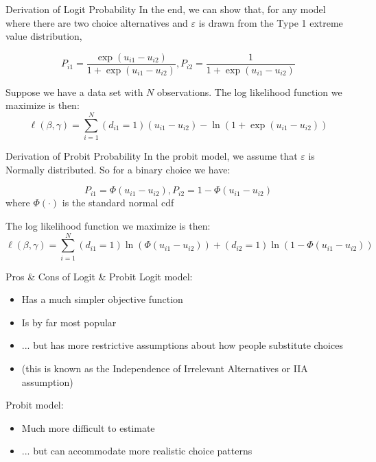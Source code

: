 \documentclass[english,aspectratio=169,12pt,xcolor=dvipsnames]{beamer}
\begin{document}
\begin{frame}{Derivation of Logit Probability}
In the end, we can show that, for any model where there are two choice alternatives and $\varepsilon$ is drawn from the Type 1 extreme value distribution,

\begin{displaymath}
P_{i1}=\frac{\exp(u_{i1}-u_{i2})}{1+\exp(u_{i1}-u_{i2})},P_{i2}=\frac{1}{1+\exp(u_{i1}-u_{i2})}
\end{displaymath}

Suppose we have a data set with $N$ observations. The log likelihood function we maximize is then:
\begin{displaymath}
\ell(\beta,\gamma)=\sum_{i=1}^N(d_{i1}=1)(u_{i1}-u_{i2})-\ln\left(1+\exp(u_{i1}-u_{i2})\right)
\end{displaymath}

\end{frame}



\begin{frame}{Derivation of Probit Probability}
In the probit model, we assume that $\varepsilon$ is Normally distributed. So for a binary choice we have:

\begin{displaymath}
P_{i1}=\Phi\left(u_{i1}-u_{i2}\right),P_{i2}=1-\Phi\left(u_{i1}-u_{i2}\right)
\end{displaymath}
where $\Phi\left(\cdot\right)$ is the standard normal cdf

The log likelihood function we maximize is then:
\begin{displaymath}
\ell(\beta,\gamma)=\sum_{i=1}^N(d_{i1}=1)\ln\left(\Phi\left(u_{i1}-u_{i2}\right)\right)+(d_{i2}=1)\ln\left(1-\Phi\left(u_{i1}-u_{i2}\right)\right)
\end{displaymath}

\end{frame}



\begin{frame}{Pros \& Cons of Logit \& Probit}
Logit model:
\begin{itemize}
\item Has a much simpler objective function 
\item Is by far most popular
\item ... but has more restrictive assumptions about how people substitute choices
\item (this is known as the Independence of Irrelevant Alternatives or IIA assumption)
\end{itemize}

Probit model:
\begin{itemize}
\item Much more difficult to estimate 
\item ... but can accommodate more realistic choice patterns
\end{itemize}

\end{frame}
\end{document}
